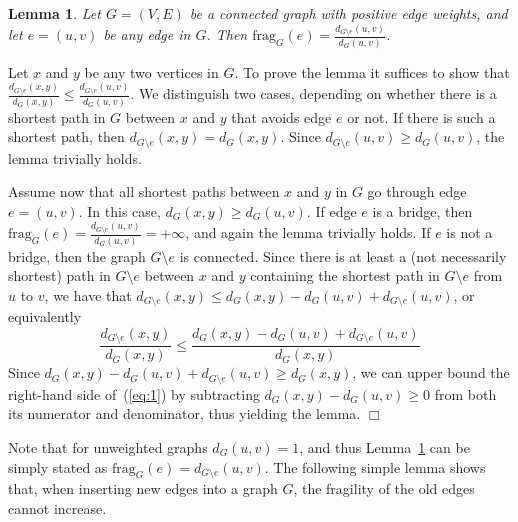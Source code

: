 \documentclass{article}
\newcommand{\dist}          {d}
\newcommand{\frag}          {\mathrm{frag}}
\newtheorem{lemma}[theorem]{Lemma}
\newcommand{\qed}{\hfill \ensuremath{\Box}}
\newenvironment{proof}{\vspace{1ex}\noindent{\bf Proof.}\hspace{0.5em}}
	{\hfill\qed\vspace{2ex}}
\begin{document}
\begin{lemma}\label{le:shortcutratio}
Let $G=(V,E)$ be a connected graph with positive edge weights, and let $e=(u,v)$ be any edge in $G$.
Then $\frag_G(e) = \frac{\dist_{G\setminus e}(u,v)}{\dist_{G}(u,v)}$.
\end{lemma}
\begin{proof}
Let $x$ and $y$ be any two vertices in $G$.
To prove the lemma it suffices to show that 
$\frac{\dist_{G \setminus e}(x,y)}{\dist_{G}(x,y)} \leq \frac{\dist_{G \setminus e}(u,v)}{\dist_{G}(u,v)}$.
We distinguish two cases, depending on whether there is a shortest path in $G$ between $x$ and $y$  that 
avoids edge $e$ or not.
If there is such a shortest path, then $\dist_{G \setminus e}(x,y) = \dist_{G}(x,y)$. Since $\dist_{G \setminus e}(u,v)\geq {\dist_{G}(u,v)}$,
the lemma trivially holds. 

Assume now that all shortest paths between $x$ and $y$ in $G$ go through edge $e=(u,v)$. In this case, $\dist_G(x,y) \geq \dist_G(u,v)$. 
If edge $e$ is a bridge, then  $\frag_G(e) = \frac{\dist_{G\setminus e}(u,v)}{\dist_{G}(u,v)} =+\infty$, and again the lemma trivially holds.
If $e$ is not a bridge, then the graph $G\setminus e$ is connected.
Since there is at least a (not necessarily shortest) path in $G\setminus e$ between $x$ and $y$ containing the shortest path in $G\setminus e$ from $u$ to $v$, we have that
$\dist_{G\setminus e}(x,y) \leq  \dist_G(x,y) - \dist_G(u,v) + \dist_{G\setminus e}(u,v)$, 
or equivalently
\begin{equation}\frac{\dist_{G \setminus e}(x,y)}{\dist_{G}(x,y)}
\leq
\frac{\dist_G(x, y) - \dist_G(u,v) + \dist_{G\setminus e}(u,v)}{\dist_{G}(x,y)}
\label{eq:1}
\end{equation}
Since $\dist_G(x, y) - \dist_G(u,v) + \dist_{G\setminus e}(u,v)\geq \dist_{G}(x,y)$, we can
upper bound the right-hand side of~(\ref{eq:1}) by subtracting $\dist_G(x,y) - \dist_G(u,v)\geq 0$ from both its numerator and denominator, thus yielding the lemma.
\end{proof}

Note that for unweighted graphs ${\dist_{G}(u,v)}=1$, and thus 
Lemma~\ref{le:shortcutratio} can be simply stated as $\frag_G(e) =
{\dist_{G\setminus e}(u,v)}$. 
The following simple lemma shows that, when inserting new edges into a graph $G$, the fragility of the old  edges cannot increase.
\end{document}
